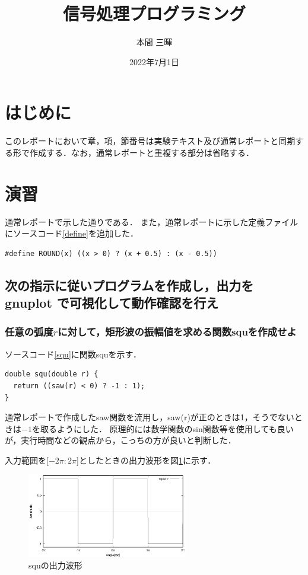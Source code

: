\documentclass[titlepage]{jarticle}
\title{信号処理プログラミング}
\author{本間 三暉}
\date{2022年7月1日}
\begin{document}
\maketitle
\section{はじめに}
このレポートにおいて章，項，節番号は実験テキスト及び通常レポートと同期する形で作成する．なお，通常レポートと重複する部分は省略する．
\setcounter{section}{1}
\section{演習}
通常レポートで示した通りである．
また，通常レポートに示した定義ファイルにソースコード\ref{define}を追加した．
\begin{lstlisting}[caption=定義ファイル追加,label=define]
#define ROUND(x) ((x > 0) ? (x + 0.5) : (x - 0.5))
\end{lstlisting}
\subsection{次の指示に従いプログラムを作成し，出力を gnuplot で可視化して動作確認を行え}
\setcounter{subsubsection}{2}
\subsubsection{任意の弧度$r$に対して，矩形波の振幅値を求める関数squを作成せよ}
ソースコード\ref{squ}に関数squを示す．
\begin{lstlisting}[caption=double squ(double r),label=squ]
double squ(double r) {
  return ((saw(r) < 0) ? -1 : 1);
}
\end{lstlisting}
通常レポートで作成したsaw関数を流用し，saw(r)が正のときは1，そうでないときは$-1$を取るようにした．
原理的には数学関数のsin関数等を使用しても良いが，実行時間などの観点から，こっちの方が良いと判断した．

入力範囲を[$-2\pi:2\pi$]としたときの出力波形を図\ref{fig:squ}に示す．
\begin{figure}[H]
  \centering
  \includegraphics[width=7cm]{EPS/squ.eps}
  \caption{squの出力波形}
  \label{fig:squ}
\end{figure}
\end{document}
